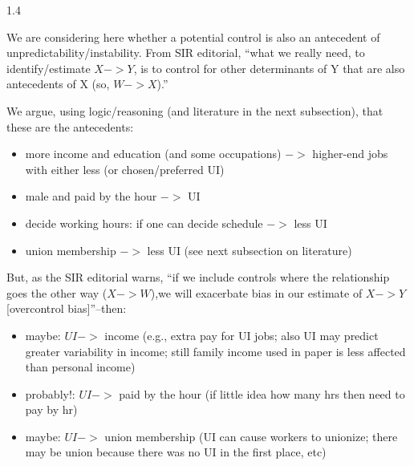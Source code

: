 \documentclass[10pt, letterpaper]{article}
\begin{document}
\begin{spacing}{1.4}


We are considering here whether a potential control is also an antecedent of unpredictability/instability. From SIR editorial, ``what we really need, to identify/estimate $X->Y$, is to control for other determinants of Y that are also antecedents of X (so, $W->X$).''

We argue, using logic/reasoning (and literature in the next subsection), that these are the antecedents:

\begin{itemize}
\item more income and education (and some occupations) $->$ higher-end jobs with either less  (or chosen/preferred UI)
\item male and paid by the hour $->$ UI
\item decide working hours: if one can decide schedule $->$ less UI
\item union membership $->$ less UI (see next subsection on literature) 
\end{itemize}

But, as the SIR editorial warns, ``if we include controls where the relationship goes the other way ($X->W$),we will exacerbate bias in our estimate of $X->Y$[overcontrol bias]''--then:

\begin{itemize}
\item maybe: $UI ->$ income (e.g., extra pay for UI jobs; also UI may predict greater variability
in income; still family income used in paper is less affected than personal income)
\item probably!: $UI ->$ paid by the hour (if little idea how many hrs then need to pay by hr) 
\item maybe: $UI ->$ union membership (UI can cause workers to unionize; there may be union because there was no UI in the first place, etc) 
\end{itemize}


\end{spacing}
\end{document}
